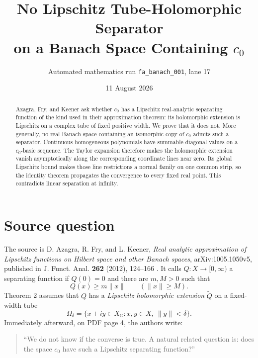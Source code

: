 \documentclass[11pt]{article}
\title{No Lipschitz Tube-Holomorphic Separator\\on a Banach Space Containing $c_0$}
\author{Automated mathematics run \texttt{fa\_banach\_001}, lane 17}
\date{11 August 2026}
\newcommand{\C}{\mathbb C}
\begin{document}
\maketitle

\begin{center}
\end{center}

\begin{abstract}
Azagra, Fry, and Keener ask whether $c_0$ has a Lipschitz real-analytic
separating function of the kind used in their approximation theorem: its
holomorphic extension is Lipschitz on a complex tube of fixed positive width.
We prove that it does not.  More generally, no real Banach space containing an
isomorphic copy of $c_0$ admits such a separator.  Continuous homogeneous
polynomials have summable diagonal values on a $c_0$-basic sequence.  The
Taylor expansion therefore makes the holomorphic extension vanish
asymptotically along the corresponding coordinate lines near zero.  Its
global Lipschitz bound makes those line restrictions a normal family on one
common strip, so the identity theorem propagates the convergence to every
fixed real point.  This contradicts linear separation at infinity.
\end{abstract}

\section{Source question}

The source is D. Azagra, R. Fry, and L. Keener, \emph{Real analytic
approximation of Lipschitz functions on Hilbert space and other Banach
spaces}, arXiv:1005.1050v5, published in J. Funct. Anal. \textbf{262} (2012),
124--166 \cite{AFK}.  It calls $Q:X\to[0,\infty)$ a separating function if
$Q(0)=0$ and there are $m,M>0$ such that
\[
 Q(x)\ge m\|x\|\qquad(\|x\|\ge M).
\]
Theorem 2 assumes that $Q$ has a \emph{Lipschitz holomorphic extension}
$\widetilde Q$ on a fixed-width tube
\[
 \Omega_\delta=\{x+iy\in X_{\C}:x,y\in X,\ \|y\|<\delta\}.
\]
Immediately afterward, on PDF page 4, the authors write:
\begin{quote}
``We do not know if the converse is true. A natural related question is: does
the space $c_0$ have such a Lipschitz separating function?''
\end{quote}
\end{document}
